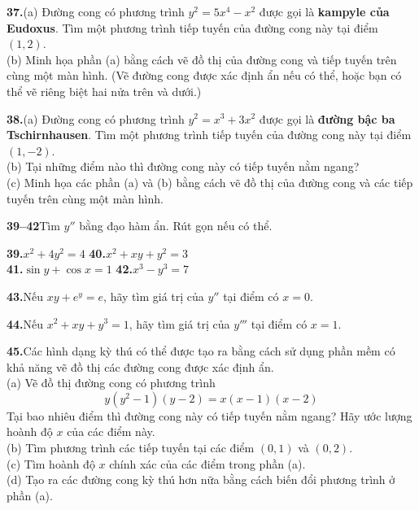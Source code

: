 \begin{minipage}[t]{0.48\textwidth}
  \noindent
  \textbf{37.}\enspace (a) Đường cong có phương trình $y^2 = 5x^4 - x^2$ được gọi là \textbf{kampyle của Eudoxus}. Tìm một phương trình tiếp tuyến của đường cong này tại điểm $(1, 2)$.\\[0.3em]
  \makebox[0pt][r]{\graphicon\enspace}(b) Minh họa phần (a) bằng cách vẽ đồ thị của đường cong và tiếp tuyến trên cùng một màn hình. (Vẽ đường cong được xác định ẩn nếu có thể, hoặc bạn có thể vẽ riêng biệt hai nửa trên và dưới.)
  \vspace{0.45em}

  \noindent
  \textbf{38.}\enspace (a) Đường cong có phương trình $y^2 = x^3 + 3x^2$ được gọi là \textbf{đường bậc ba Tschirnhausen}. Tìm một phương trình tiếp tuyến của đường cong này tại điểm $(1, -2)$.\\[0.3em]
  (b) Tại những điểm nào thì đường cong này có tiếp tuyến nằm ngang?\\[0.3em]
  \makebox[0pt][r]{\graphicon\enspace}(c) Minh họa các phần (a) và (b) bằng cách vẽ đồ thị của đường cong và các tiếp tuyến trên cùng một màn hình.
  \vspace{0.45em}

  \noindent\secrule\vspace{0.35em}
  {\color{stewartcyan}\textbf{39--42}}\enspace Tìm $y''$ bằng đạo hàm ẩn. Rút gọn nếu có thể.
  \vspace{0.35em}

  \noindent
  \textbf{39.}\enspace $x^2 + 4y^2 = 4$ \hfill \textbf{40.}\enspace $x^2 + xy + y^2 = 3$\\[0.35em]
  \textbf{41.}\enspace $\sin y + \cos x = 1$ \hfill \textbf{42.}\enspace $x^3 - y^3 = 7$
  \vspace{0.25em}

  \noindent\secrule\vspace{0.45em}

  \noindent
  \textbf{43.}\enspace Nếu $xy + e^y = e$, hãy tìm giá trị của $y''$ tại điểm có $x = 0$.
  \vspace{0.45em}

  \noindent
  \textbf{44.}\enspace Nếu $x^2 + xy + y^3 = 1$, hãy tìm giá trị của $y'''$ tại điểm có $x = 1$.
  \vspace{0.45em}

  \noindent
  \makebox[0pt][r]{\graphicon\enspace}\textbf{45.}\enspace Các hình dạng kỳ thú có thể được tạo ra bằng cách sử dụng phần mềm có khả năng vẽ đồ thị các đường cong được xác định ẩn.\\[0.3em]
  (a) Vẽ đồ thị đường cong có phương trình
  \[ y(y^2 - 1)(y - 2) = x(x - 1)(x - 2) \]
  Tại bao nhiêu điểm thì đường cong này có tiếp tuyến nằm ngang? Hãy ước lượng hoành độ $x$ của các điểm này.\\[0.3em]
  (b) Tìm phương trình các tiếp tuyến tại các điểm $(0, 1)$ và $(0, 2)$.\\[0.3em]
  (c) Tìm hoành độ $x$ chính xác của các điểm trong phần (a).\\[0.3em]
  (d) Tạo ra các đường cong kỳ thú hơn nữa bằng cách biến đổi phương trình ở phần (a).
  \vspace{0.45em}


\end{minipage}
